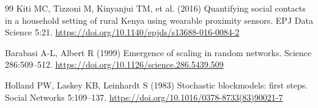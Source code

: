 \documentclass[smallextended]{svjour3}
\begin{document}
\begin{thebibliography}{99}
 Kiti MC, Tizzoni M, Kinyanjui TM, et al. (2016) Quantifying social contacts in a household setting of rural Kenya using wearable proximity sensors. EPJ Data Science 5:21. \url{https://doi.org/10.1140/epjds/s13688-016-0084-2}

 Barabasi A-L, Albert R (1999) Emergence of scaling in random networks. Science 286:509--512. \url{https://doi.org/10.1126/science.286.5439.509}

 Holland PW, Laskey KB, Leinhardt S (1983) Stochastic blockmodels: first steps. Social Networks 5:109--137. \url{https://doi.org/10.1016/0378-8733(83)90021-7}
\end{thebibliography}
\end{document}
